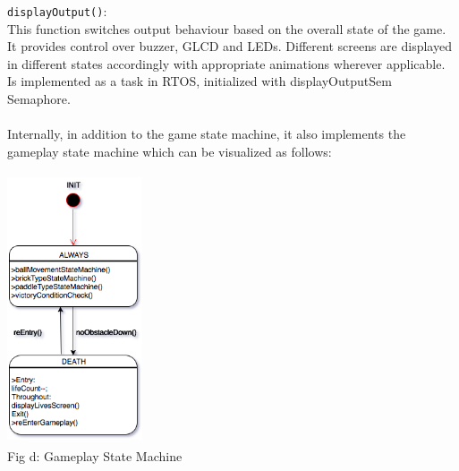 \documentclass{article}
\begin{document}
\texttt{displayOutput()}: \\ This function switches output behaviour based on the overall state of the game. It provides control over buzzer, GLCD and LEDs. Different screens are displayed in different states accordingly with appropriate animations wherever applicable. Is implemented as a task in RTOS, initialized with displayOutputSem Semaphore. \\
\\ \qquad Internally, in addition to the game state machine, it also implements the gameplay state machine which can be visualized as follows:
\begin{center}
\includegraphics[width=4cm, height=8cm]{gameplayStateMachine}
\\ {\small Fig d: Gameplay State Machine}
\end{center}
\end{document}
